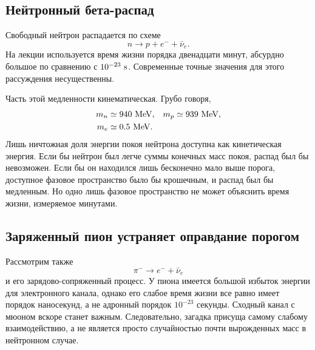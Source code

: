 \subsection{Нейтронный бета-распад}

Свободный нейтрон распадается по схеме
\begin{equation}
n\longrightarrow p+e^-+\bar\nu_e.
\label{eq:l5-neutron-decay-intro}
\end{equation}
На лекции используется время жизни порядка двенадцати минут, абсурдно большое по сравнению с \(10^{-23}\ {\rm s}\). Современные точные значения для этого рассуждения несущественны.

Часть этой медленности кинематическая. Грубо говоря,
\begin{equation}
\begin{aligned}
m_n&\simeq940\ {\rm MeV},
&
m_p&\simeq939\ {\rm MeV},
\\
m_e&\simeq0.5\ {\rm MeV}.
\end{aligned}
\end{equation}
Лишь ничтожная доля энергии покоя нейтрона доступна как кинетическая энергия. Если бы нейтрон был легче суммы конечных масс покоя, распад был бы невозможен. Если бы он находился лишь бесконечно мало выше порога, доступное фазовое пространство было бы крошечным, и распад был бы медленным. Но одно лишь фазовое пространство не может объяснить время жизни, измеряемое минутами.

\subsection{Заряженный пион устраняет оправдание порогом}

Рассмотрим также
\begin{equation}
\pi^-\longrightarrow e^-+\bar\nu_e
\end{equation}
и его зарядово-сопряженный процесс. У пиона имеется большой избыток энергии для электронного канала, однако его слабое время жизни все равно имеет порядок наносекунд, а не адронный порядок \(10^{-23}\) секунды. Сходный канал с мюоном вскоре станет важным. Следовательно, загадка присуща самому слабому взаимодействию, а не является просто случайностью почти вырожденных масс в нейтронном случае.



